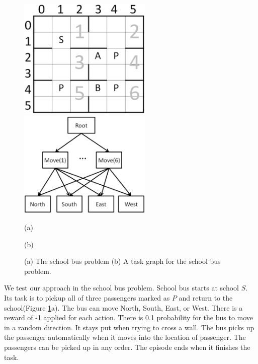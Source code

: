 \documentclass{article} %
\begin{document}
\begin{figure}[t]
 \begin{minipage}[b]{0.5\linewidth}
    \includegraphics[width=2.5in] {BusSmall.eps}
\end{minipage}
\begin{minipage}[b]{0.5\linewidth}
    \includegraphics[width=2.5in] {BusHierarchy.eps}
\end{minipage}
\begin{minipage}[b]{0.5\linewidth} \centering (a) \end{minipage}
\begin{minipage}[b]{0.5\linewidth} \centering (b) \end{minipage}

\caption{(a) The school bus problem (b) A task graph for the school bus problem.}
\label{fig:bus}
\end{figure}

We test our approach in the school bus problem. School bus starts at school $S$. Its task 
is to pickup all of three passengers marked as $P$ and return to the school(Figure \ref{fig:bus}a).
The bus can move North, South, East, or West. There is a reward of -1 applied for each action.
There is 0.1 probability for the bus to move in a random direction. It stays put 
when trying to cross a wall. 
The bus picks up the passenger automatically when it moves into
the location of passenger. The passengers can be picked up in any order.
The episode ends when it finishes the task. 
\end{document}
